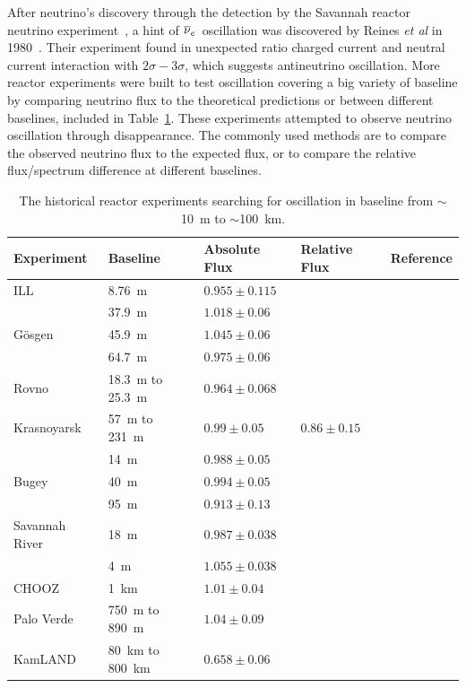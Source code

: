     After neutrino's discovery through the detection by the Savannah reactor neutrino experiment~\cite{bib:CowanReines},
    a hint of $\overline{\nu }_{e}\hspace{1pt}$ oscillation was discovered by Reines \textit{et al} in 1980~\cite{bib:reines1980}.
    Their experiment found in unexpected ratio charged current and neutral current interaction with $2\sigma-3\sigma$, which suggests antineutrino oscillation.
    More reactor experiments were built to test \nuebar oscillation covering a big variety of baseline by comparing neutrino flux to the theoretical predictions or between different baselines, included in Table~\ref{tab:history}.
    These experiments attempted to observe neutrino oscillation through \nuebar disappearance.
    The commonly used methods are to compare the observed neutrino flux to the expected flux, or to compare the relative flux/spectrum difference at different baselines.
    \begin{table}[!htbp]
    \centering
    \caption[Historical reactor oscillation experiments]{The historical reactor experiments searching for \nuebar oscillation in baseline from $\sim$10~m to $\sim$100~km.}
    \begin{tabular}{lllll}
    \hline
    Experiment  & Baseline   & Absolute Flux  & Relative Flux    & Reference   \\ 
    \hline
    ILL     & 8.76~m  & $0.955\pm 0.115$  &  & \cite{bib:kwon1981}  \\
    \hline
        & 37.9~m   & $1.018\pm 0.06$  &   &   \\
    G\"osgen  & 45.9~m  & $1.045\pm 0.06$  &   & \cite{bib:gosgen}  \\
        & 64.7~m    & $0.975\pm 0.06$  &   &   \\
    \hline
    Rovno     & 18.3~m to 25.3~m     & $0.964\pm 0.068$  &   & \cite{bib:Afonin1987}  \\
    \hline
    Krasnoyarsk     &  57~m to 231~m    & $0.99\pm 0.05$  & $0.86\pm 0.15$  &  \cite{bib:Vidyakin1994} \\
    \hline
        & 14~m & $0.988\pm 0.05$  &   &   \\
    Bugey   & 40~m  & $0.994\pm 0.05$  &   &  \cite{bib:Bugey} \\
        & 95~m  & $0.913\pm 0.13$  &   &   \\
    \hline
    Savannah River  &  18~m & $0.987\pm 0.038$ &    & \cite{bib:Greenwood1996} \\
        &4~m    & $1.055\pm 0.038$  &   &   \\
    \hline
    CHOOZ   & 1~km     & $1.01\pm 0.04$   &   & \cite{bib:chooz98, bib:Chooz99, bib:chooz03}  \\
    \hline
    Palo Verde   &  750~m to 890~m & $1.04\pm 0.09$ &   &  \cite{bib:palo01, bib:palo1999, bib:palo2000} \\
    \hline
    KamLAND & 80~km to 800~km  &  $0.658\pm 0.06$ &   & \cite{bib:KamLAND03, bib:kamland04}  \\
    \hline
    \end{tabular}
    \label{tab:history}
    \end{table}
 
